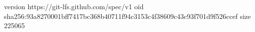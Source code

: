 version https://git-lfs.github.com/spec/v1
oid sha256:93a8270001bff7417bc368b40711f94c3153c4f38609c43c93f701d9f526ccef
size 225065
